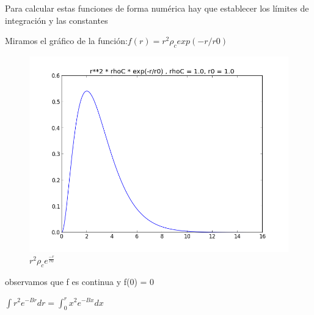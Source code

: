 \documentclass[12pt]{book}
\begin{document}
\begin{description}
\item Para calcular estas funciones de forma numérica hay que establecer los límites de integración y las constantes
\item Miramos el gráfico de la función:$ f(r) = r^2 \rho_c  exp(-r/r0)$
\begin{figure}[!ht]
 \centering
 \includegraphics[scale=0.33]{func1Plot.png}
 \caption{\emph{$r^2  \rho_c  e^{\frac{-r}{r0}}$}}
\end{figure}
observamos que  f es  continua y f(0) = 0
\item  $\int{r^2 e^{-Br}dr} = \int_0^r{x^2 e^{-Bx}dx}$



\end{description}
\end{document}
